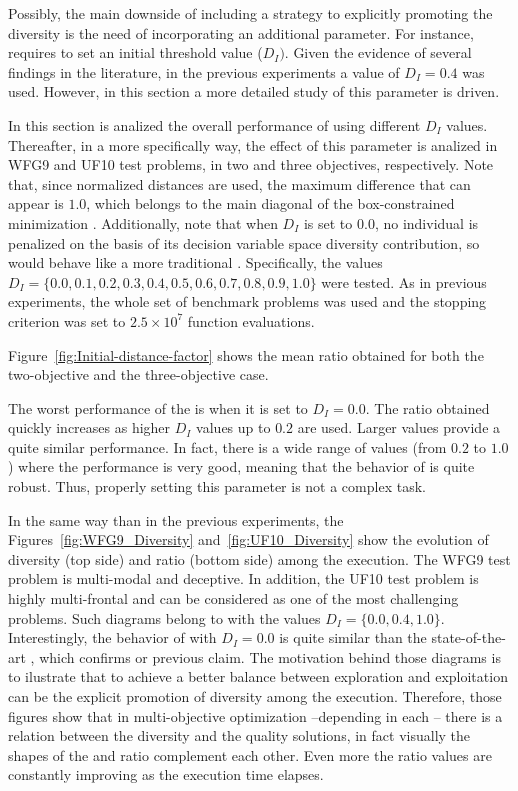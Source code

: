 Possibly, the main downside of including a strategy to explicitly promoting the diversity is the need of incorporating an additional parameter.
%
For instance, \VSDMOEAD{} requires to set an initial threshold value ($D_I)$.
%
Given the evidence of several findings in the literature, in the previous experiments a value of $D_I=0.4$ was used.
%
However, in this section a more detailed study of this parameter is driven.
%

%
In this section is analized the overall performance of \VSDMOEAD{} using different $D_I$ values.
%
Thereafter, in a more specifically way, the effect of this parameter is analized in WFG9 and UF10 test problems, in two and three objectives, respectively.
%
Note that, since normalized distances are used, the maximum difference that can appear is $1.0$, which belongs to the main diagonal of the box-constrained minimization \MOP{}.
%
Additionally, note that when $D_I$ is set to $0.0$, no individual is penalized on the basis of its decision variable space diversity contribution, so \VSDMOEA{} would behave like a more traditional \MOEA{}.
%
Specifically, the values $D_I = \{0.0, 0.1, 0.2, 0.3, 0.4, 0.5, 0.6, 0.7, 0.8, 0.9, 1.0\}$ were tested.
%
As in previous experiments, the whole set of benchmark problems was used and the stopping criterion was set to $2.5 \times 10^7$ function evaluations.

Figure~\ref{fig:Initial-distance-factor} shows the mean \HV{} ratio obtained for both the two-objective  and the three-objective case.
%

The worst performance of the \VSDMOEAD{} is when it is set to $D_I=0.0$.
%
The \HV{} ratio obtained quickly increases as higher $D_I$ values up to $0.2$ are used.
%
Larger values provide a quite similar performance.
%
In fact, there is a wide range of values (from $0.2$ to $1.0$) where the performance is very good, meaning that the behavior of \VSDMOEA{} is quite robust.
%
Thus, properly setting this parameter is not a complex task.
%

In the same way than in the previous experiments, the Figures~\ref{fig:WFG9_Diversity} and~\ref{fig:UF10_Diversity} show the evolution of diversity (top side) and \HV{} ratio (bottom side) among the execution.
%
The WFG9 test problem is multi-modal and deceptive.
%
In addition, the UF10 test problem is highly multi-frontal and can be considered as one of the most challenging problems.
%
Such diagrams belong to \VSDMOEAD{} with the values $D_I = \{0.0, 0.4, 1.0\}$.
%
Interestingly, the behavior of \VSDMOEAD{} with $D_I=0.0$ is quite similar than the state-of-the-art \MOEAS{}, which confirms or previous claim.
%
The motivation behind those diagrams is to ilustrate that to achieve a better balance between exploration and exploitation can be the explicit promotion of diversity among the execution.
%
Therefore, those figures show that in multi-objective optimization --depending in each \MOP{}-- there is a relation between the diversity and the quality solutions, in fact visually the shapes of the \ADI{} and \HV{} ratio complement each other.
%
Even more the \HV{} ratio values are constantly improving as the execution time elapses.
%

